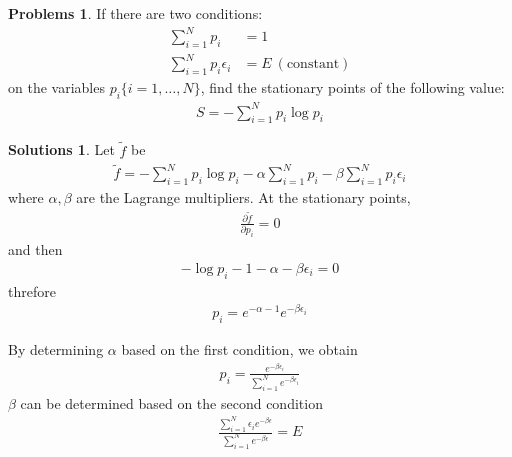\documentclass[draft]{article}
\theoremstyle{definition}
\newtheorem{problem}{Problems}[section]
\newtheorem{solution}{Solutions}[section]
\newcommand{\pardif}[2]{\frac{\partial #1}{\partial #2}}
\begin{document}
\begin{problem}
    If there are two conditions:
    \begin{align}
        \sum_{i=1}^Np_i&=1\\
        \sum_{i=1}^Np_i\epsilon_i&=E\ (\mathrm{constant})
    \end{align}
    on the variables $p_i \{i=1,\ldots,N\}$, find the stationary points of the following value:
    \begin{align}
        S=-\sum_{i=1}^Np_i\log p_i
    \end{align}
\end{problem}
\begin{solution}
    Let $\tilde{f}$ be 
    \begin{align}
        \tilde{f} = -\sum_{i=1}^Np_i\log p_i-\alpha\sum_{i=1}^Np_i -\beta\sum_{i=1}^Np_i\epsilon_i
    \end{align}
    where $\alpha, \beta$ are the Lagrange multipliers. At the stationary points,
    \begin{align}
        \pardif{\tilde{f}}{p_i} = 0
    \end{align}
    and then
    \begin{align}
        -\log p_i - 1 - \alpha -\beta\epsilon_i = 0
    \end{align}
    threfore
    \begin{align}
            p_i = e^{-\alpha - 1} e^{-\beta\epsilon_i}
    \end{align}

    By determining $\alpha$ based on the first condition, we obtain
    \begin{align}
        p_i = \frac{e^{-\beta\epsilon_i}}{\sum_{i=1}^Ne^{-\beta\epsilon_i}}
    \end{align}
    $\beta$ can be determined based on the second condition
    \begin{align}
        \frac{\sum_{i=1}^N\epsilon_ie^{-\beta\epsilon}}{\sum_{i=1}^Ne^{-\beta\epsilon}} = E
    \end{align}
\end{solution}    
\end{document}
